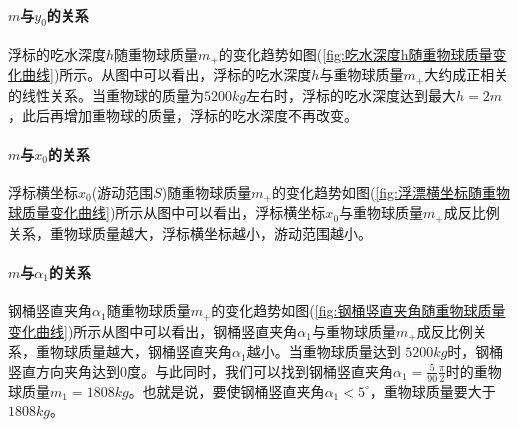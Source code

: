 \documentclass[UTF8]{ctexbook}
\theoremstyle{nonumberplain}
\begin{document}
            \paragraph{$m$与$y_0$的关系}浮标的吃水深度$h$随重物球质量$m_+$的变化趋势如图(\ref{fig:吃水深度h随重物球质量变化曲线})所示。从图中可以看出，浮标的吃水深度$h$与重物球质量$m_+$大约成正相关的线性关系。当重物球的质量为$5200kg$左右时，浮标的吃水深度达到最大$h=2m$，此后再增加重物球的质量，浮标的吃水深度不再改变。
            \paragraph{$m$与$x_0$的关系}浮标横坐标$x_0$(游动范围$S$)随重物球质量$m_+$的变化趋势如图(\ref{fig:浮漂横坐标随重物球质量变化曲线})所示从图中可以看出，浮标横坐标$x_0$与重物球质量$m_+$成反比例关系，重物球质量越大，浮标横坐标越小，游动范围越小。
            \paragraph{$m$与$\alpha_1$的关系}钢桶竖直夹角$\alpha_1$随重物球质量$m_+$的变化趋势如图(\ref{fig:钢桶竖直夹角随重物球质量变化曲线})所示从图中可以看出，钢桶竖直夹角$\alpha_1$与重物球质量$m_+$成反比例关系，重物球质量越大，钢桶竖直夹角$\alpha_1$越小。当重物球质量达到 $5200kg $时，钢桶竖直方向夹角达到$ 0 $度。与此同时，我们可以找到钢桶竖直夹角$\alpha_1=\frac{5}{90}\frac{\pi}{2}$时的重物球质量$m_1 = 1808kg$。也就是说，要使钢桶竖直夹角$\alpha_1 <5^\circ$，重物球质量要大于$1808kg $。
\end{document}
